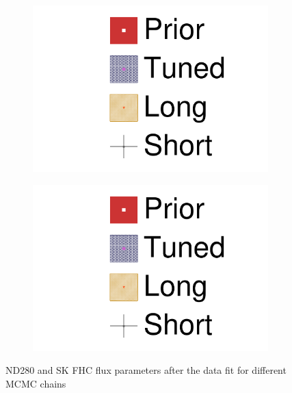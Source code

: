 \begin{figure}[h]
\begin{subfigure}[t]{0.24\textwidth}
		\includegraphics[width=\textwidth, trim={0mm 0mm 0mm 0mm}, clip,page=12]{figures/mach3/data/2017b_NewData_NewDet_UpdXsecStep_2Xsec_4Det_5Flux_0_2017b_June_NewDet_merge_2017b_NewDet_June_Long_0}
	\end{subfigure}
	\begin{subfigure}[t]{0.24\textwidth}
		\includegraphics[width=\textwidth, trim={0mm 0mm 0mm 0mm}, clip,page=13]{figures/mach3/data/2017b_NewData_NewDet_UpdXsecStep_2Xsec_4Det_5Flux_0_2017b_June_NewDet_merge_2017b_NewDet_June_Long_0}
	\end{subfigure}
	\caption{ND280 and SK FHC flux parameters after the data fit for different MCMC chains}
	\label{fig:flux_data_fhc}
\end{figure}

